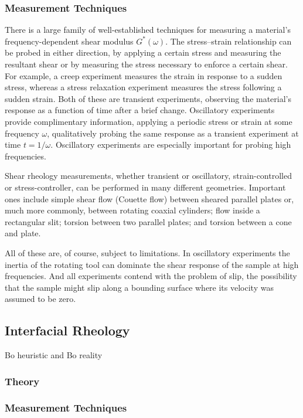 \subsubsection{Measurement Techniques}

There is a large family of well-established techniques for measuring a material's frequency-dependent shear modulus $G^*(\omega)$. The stress--strain relationship can be probed in either direction, by applying a certain stress and measuring the resultant shear or by measuring the stress necessary to enforce a certain shear. For example, a creep experiment measures the strain in response to a sudden stress, whereas a stress relaxation experiment measures the stress following a sudden strain. Both of these are transient experiments, observing the material's response as a function of time after a brief change. Oscillatory experiments provide complimentary information, applying a periodic stress or strain at some frequency $\omega$, qualitatively probing the same response as a transient experiment at time $t=1/\omega$. Oscillatory experiments are especially important for probing high frequencies.

Shear rheology measurements, whether transient or oscillatory, strain-controlled or stress-controller, can be performed in many different geometries. Important ones include simple shear flow (Couette flow) between sheared parallel plates or, much more commonly, between rotating coaxial cylinders; flow inside a rectangular slit; torsion between two parallel plates; and torsion between a cone and plate.

All of these are, of course, subject to limitations. In oscillatory experiments the inertia of the rotating tool can dominate the shear response of the sample at  high frequencies. And all experiments contend with the problem of slip, the possibility that the sample might slip along a bounding surface where its velocity was assumed to be zero.

\subsection{Interfacial Rheology}


Bo heuristic and Bo reality
\subsubsection{Theory}
\subsubsection{Measurement Techniques}
